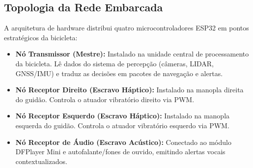\documentclass[12pt,a4paper]{article}
\begin{document}
\subsection{Topologia da Rede Embarcada}
A arquitetura de hardware distribui quatro microcontroladores ESP32 em pontos estratégicos da bicicleta:
\begin{itemize}
    \item \textbf{Nó Transmissor (Mestre):} Instalado na unidade central de processamento da bicicleta. Lê dados do sistema de percepção (câmeras, LIDAR, GNSS/IMU) e traduz as decisões em pacotes de navegação e alertas.
    \item \textbf{Nó Receptor Direito (Escravo Háptico):} Instalado na manopla direita do guidão. Controla o atuador vibratório direito via PWM.
    \item \textbf{Nó Receptor Esquerdo (Escravo Háptico):} Instalado na manopla esquerda do guidão. Controla o atuador vibratório esquerdo via PWM.
    \item \textbf{Nó Receptor de Áudio (Escravo Acústico):} Conectado ao módulo DFPlayer Mini e autofalante/fones de ouvido, emitindo alertas vocais contextualizados.
\end{itemize}
\end{document}
